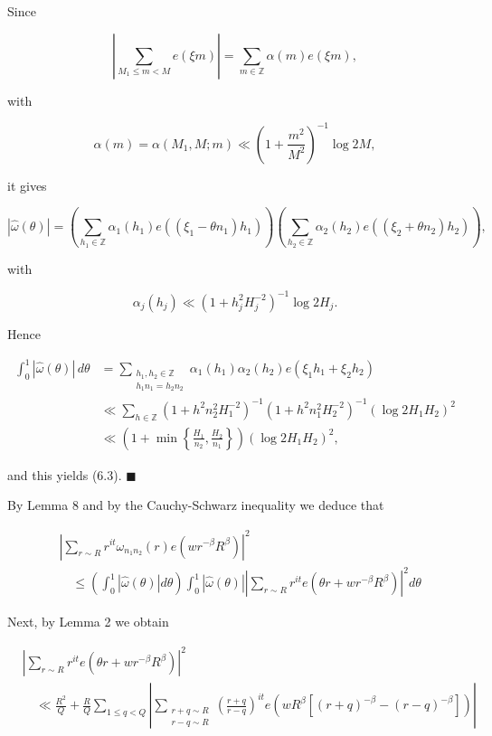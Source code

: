 \documentclass[10pt]{article}
\newcommand{\proofend}{\hfill\(\blacksquare\)}
\begin{document}
Since

$$
\left|\sum_{M_1\leqslant m<M}e(\xi m)\right|
=\sum_{m\in\mathbb Z}\alpha(m)e(\xi m),
$$

with

$$
\alpha(m)=\alpha(M_1,M;m)\ll
\left(1+\frac{m^2}{M^2}\right)^{-1}\log 2M,
$$

it gives

$$
|\widehat\omega(\theta)|=
\left(\sum_{h_1\in\mathbb Z}\alpha_1(h_1)e((\xi_1-\theta n_1)h_1)\right)
\left(\sum_{h_2\in\mathbb Z}\alpha_2(h_2)e((\xi_2+\theta n_2)h_2)\right),
$$

with

$$
\alpha_j(h_j)\ll\left(1+h_j^2H_j^{-2}\right)^{-1}\log 2H_j.
$$

Hence

$$
\begin{aligned}
\int_0^1|\widehat\omega(\theta)|\,d\theta
&=\sum_{\substack{h_1,h_2\in\mathbb Z\\h_1n_1=h_2n_2}}
\alpha_1(h_1)\alpha_2(h_2)e(\xi_1h_1+\xi_2h_2)\\
&\ll\sum_{h\in\mathbb Z}
\left(1+h^2n_2^2H_1^{-2}\right)^{-1}
\left(1+h^2n_1^2H_2^{-2}\right)^{-1}
\left(\log 2H_1H_2\right)^2\\
&\ll\left(1+\min\left\{\frac{H_1}{n_2},\frac{H_2}{n_1}\right\}\right)
\left(\log 2H_1H_2\right)^2,
\end{aligned}
$$

and this yields (6.3). \proofend

By Lemma 8 and by the Cauchy-Schwarz inequality we deduce that

$$
\begin{aligned}
& \left|\sum_{r \sim R} r^{i t} \omega_{n_{1} n_{2}}(r) e\left(w r^{-\beta} R^{\beta}\right)\right|^{2} \\
& \quad \leqslant\left(\int_{0}^{1}|\widehat{\omega}(\theta)| d \theta\right) \int_{0}^{1}|\widehat{\omega}(\theta)|\left|\sum_{r \sim R} r^{i t} e\left(\theta r+w r^{-\beta} R^{\beta}\right)\right|^{2} d \theta
\end{aligned}
$$

Next, by Lemma 2 we obtain

$$
\begin{aligned}
& \left|\sum_{r \sim R} r^{i t} e\left(\theta r+w r^{-\beta} R^{\beta}\right)\right|^{2} \\
& \quad\ll\frac{R^{2}}{Q}+\frac{R}{Q} \sum_{1 \leqslant q<Q}\left|\sum_{\substack{r+q \sim R \\
r-q \sim R}}\left(\frac{r+q}{r-q}\right)^{i t} e\left(w R^{\beta}\left[(r+q)^{-\beta}-(r-q)^{-\beta}\right]\right)\right|
\end{aligned}
$$
\end{document}
